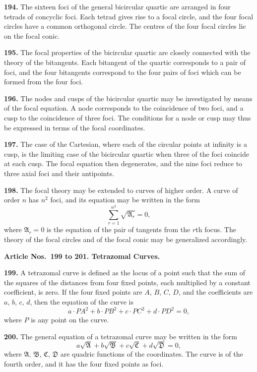 \documentclass[12pt,a4paper]{article}
\theoremstyle{definition}
\begin{document}
\noindent\textbf{194.} The sixteen foci of the general bicircular quartic are arranged in four
tetrads of concyclic foci. Each tetrad gives rise to a focal circle, and the four focal
circles have a common orthogonal circle. The centres of the four focal circles lie on
the focal conic.

\newpage
\noindent\textbf{195.} The focal properties of the bicircular quartic are closely connected
with the theory of the bitangents. Each bitangent of the quartic corresponds to a
pair of foci, and the four bitangents correspond to the four pairs of foci which can
be formed from the four foci.

\noindent\textbf{196.} The nodes and cusps of the bicircular quartic may be investigated by
means of the focal equation. A node corresponds to the coincidence of two foci, and
a cusp to the coincidence of three foci. The conditions for a node or cusp may thus
be expressed in terms of the focal coordinates.

\noindent\textbf{197.} The case of the Cartesian, where each of the circular points at infinity
is a cusp, is the limiting case of the bicircular quartic when three of the foci coincide
at each cusp. The focal equation then degenerates, and the nine foci reduce to three
axial foci and their antipoints.

\noindent\textbf{198.} The focal theory may be extended to curves of higher order. A curve
of order $n$ has $n^2$ foci, and its equation may be written in the form
\[
\sum_{r=1}^{n^2} \sqrt{\mathfrak{A}_r} = 0,
\]
where $\mathfrak{A}_r = 0$ is the equation of the pair of tangents from the $r$th focus. The theory
of the focal circles and of the focal conic may be generalized accordingly.

\vspace{0.5em}
\noindent\textbf{Article Nos.~199 to 201. Tetrazomal Curves.}

\vspace{0.3em}
\noindent\textbf{199.} A tetrazomal curve is defined as the locus of a point such that the sum
of the squares of the distances from four fixed points, each multiplied by a constant
coefficient, is zero. If the four fixed points are $A$, $B$, $C$, $D$, and the coefficients are
$a$, $b$, $c$, $d$, then the equation of the curve is
\[
a\cdot PA^2 + b\cdot PB^2 + c\cdot PC^2 + d\cdot PD^2 = 0,
\]
where $P$ is any point on the curve.

\noindent\textbf{200.} The general equation of a tetrazomal curve may be written in the form
\[
a\sqrt{\mathfrak{A}} + b\sqrt{\mathfrak{B}} + c\sqrt{\mathfrak{C}} + d\sqrt{\mathfrak{D}} = 0,
\]
where $\mathfrak{A}$, $\mathfrak{B}$, $\mathfrak{C}$, $\mathfrak{D}$ are quadric functions of the coordinates. The curve is of the fourth
order, and it has the four fixed points as foci.
\end{document}
